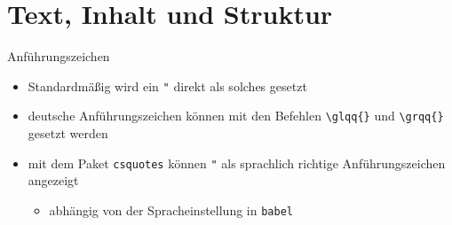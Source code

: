 \documentclass[presentation,aspectratio=169]{beamer}
\begin{document}
\maketitle

\section{Text, Inhalt und Struktur}

\begin{frame}[fragile]{Anführungszeichen}
  \begin{itemize}
    \item Standardmäßig wird ein \verb|"| direkt als solches gesetzt
    \item deutsche Anführungszeichen können mit den Befehlen \verb|\glqq{}| und \verb|\grqq{}| gesetzt werden
    \item mit dem Paket \verb|csquotes| können \verb|"| als sprachlich richtige Anführungszeichen angezeigt
      \begin{itemize}
        \item abhängig von der Spracheinstellung in \verb|babel|
      \end{itemize}
    \inputminted{latex}{codebeispiele/quotation.tex}
  \end{itemize}
\end{frame}
\end{document}
